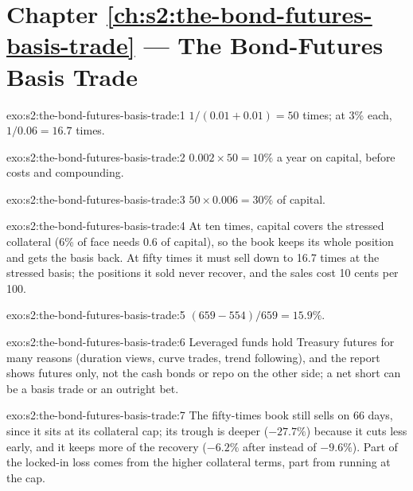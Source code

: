 \section*{Chapter \ref{ch:s2:the-bond-futures-basis-trade} --- The Bond-Futures Basis Trade}

\begin{solution}{exo:s2:the-bond-futures-basis-trade:1}
$1/(0.01 + 0.01) = 50$ times; at 3\% each, $1/0.06 = 16.7$ times.
\end{solution}

\begin{solution}{exo:s2:the-bond-futures-basis-trade:2}
$0.002 \times 50 = 10\%$ a year on capital, before costs and compounding.
\end{solution}

\begin{solution}{exo:s2:the-bond-futures-basis-trade:3}
$50 \times 0.006 = 30\%$ of capital.
\end{solution}

\begin{solution}{exo:s2:the-bond-futures-basis-trade:4}
At ten times, capital covers the stressed collateral (6\% of face needs 0.6 of capital), so the book keeps its whole position and gets the basis back.
At fifty times it must sell down to 16.7 times at the stressed basis; the positions it sold never recover, and the sales cost 10 cents per 100.
\end{solution}

\begin{solution}{exo:s2:the-bond-futures-basis-trade:5}
$(659 - 554)/659 = 15.9\%$.
\end{solution}

\begin{solution}{exo:s2:the-bond-futures-basis-trade:6}
Leveraged funds hold Treasury futures for many reasons (duration views, curve trades, trend following), and the report shows futures only, not the
cash bonds or repo on the other side; a net short can be a basis trade or an outright bet.
\end{solution}

\begin{solution}{exo:s2:the-bond-futures-basis-trade:7}
The fifty-times book still sells on 66 days, since it sits at its collateral cap; its trough is deeper ($-27.7\%$) because it cuts less early, and it
keeps more of the recovery ($-6.2\%$ after instead of $-9.6\%$). Part of the locked-in loss comes from the higher collateral terms, part from running
at the cap.
\end{solution}

